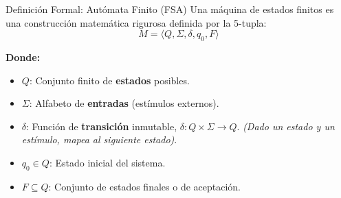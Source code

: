 \documentclass[10pt, aspectratio=169]{beamer}
\begin{document}
\begin{frame}{Definición Formal: Autómata Finito (FSA)}
        Una máquina de estados finitos es una construcción matemática rigurosa definida por la 5-tupla:
        $$M = \langle Q, \Sigma, \delta, q_0, F \rangle$$
    
    \vspace{0.2cm}
    \textbf{Donde:}
    \begin{itemize}
        \setlength\itemsep{0.2cm}
        \item $Q$: Conjunto finito de \textbf{estados} posibles.
        \item $\Sigma$: Alfabeto de \textbf{entradas} (estímulos externos).
        \item $\delta$: Función de \textbf{transición} inmutable, $\delta: Q \times \Sigma \to Q$. \textit{(Dado un estado y un estímulo, mapea al siguiente estado)}.
        \item $q_0 \in Q$: Estado inicial del sistema.
        \item $F \subseteq Q$: Conjunto de estados finales o de aceptación.
    \end{itemize}
\end{frame}
\end{document}

